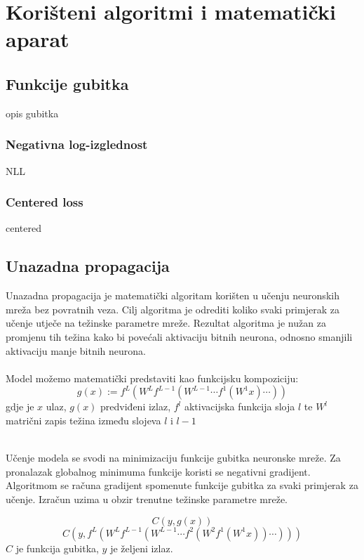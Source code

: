 \chapter{Korišteni algoritmi i matematički aparat}

\section{Funkcije gubitka}

opis gubitka

\subsection{Negativna log-izglednost}

NLL

\subsection{Centered loss}

centered



\section{Unazadna propagacija}

Unazadna propagacija je matematički algoritam korišten u učenju neuronskih mreža bez povratnih veza. Cilj algoritma je odrediti koliko svaki primjerak za učenje utječe na težinske parametre mreže. Rezultat algoritma je nužan za promjenu tih težina kako bi povećali aktivaciju bitnih neurona, odnosno smanjili aktivaciju manje bitnih neurona.\\\\Model možemo matematički predstaviti kao funkcijsku kompoziciju:
	\[g(x):=f^{L}(W^{L}f^{L-1}(W^{L-1}\cdots f^{1}(W^{1}x)\cdots ))\]
	gdje je \(x\) ulaz, \(g(x)\) predviđeni izlaz, \(f^l\) aktivacijska funkcija sloja \(l\) te \(W^l\) matrični zapis težina između slojeva \(l\) i \(l-1\)
	
	\noindent\\Učenje modela se svodi na minimizaciju funkcije gubitka neuronske mreže. Za pronalazak globalnog minimuma funkcije koristi se negativni gradijent. Algoritmom se računa gradijent spomenute funkcije gubitka za svaki primjerak za učenje. Izračun uzima u obzir trenutne težinske parametre mreže.
	
	\[C(y,g(x))\]
	\[C(y,f^{L}(W^{L}f^{L-1}(W^{L-1}\cdots f^{2}(W^{2}f^{1}(W^{1}x))\cdots )))\]
	\(C\) je funkcija gubitka, \(y\) je željeni izlaz.
	
